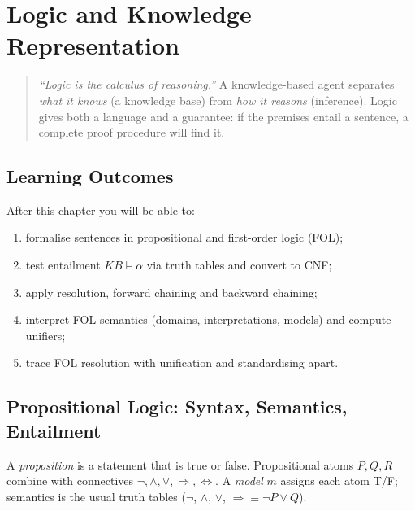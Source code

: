 \chapter{Logic and Knowledge Representation}\label{ch:logic}

\begin{quote}
\emph{``Logic is the calculus of reasoning.''} A knowledge-based agent separates \emph{what it knows} (a knowledge base) from \emph{how it reasons} (inference). Logic gives both a language and a guarantee: if the premises entail a sentence, a complete proof procedure will find it.
\end{quote}

\noindent{}
\vspace{0.4em}

\section*{Learning Outcomes}
After this chapter you will be able to:
\begin{enumerate}[label=(L\arabic*)]
    \item formalise sentences in propositional and first-order logic (FOL);
    \item test entailment $KB \models \alpha$ via truth tables and convert to CNF;
    \item apply resolution, forward chaining and backward chaining;
    \item interpret FOL semantics (domains, interpretations, models) and compute unifiers;
    \item trace FOL resolution with unification and standardising apart.
\end{enumerate}

\section{Propositional Logic: Syntax, Semantics, Entailment}\label{sec:prop}
A \emph{proposition} is a statement that is true or false. Propositional atoms $P,Q,R$ combine with connectives $\lnot,\land,\lor,\Rightarrow,\Leftrightarrow$. A \emph{model} $m$ assigns each atom T/F; semantics is the usual truth tables ($\lnot$, $\land$, $\lor$, $\Rightarrow\equiv\lnot P\lor Q$).

